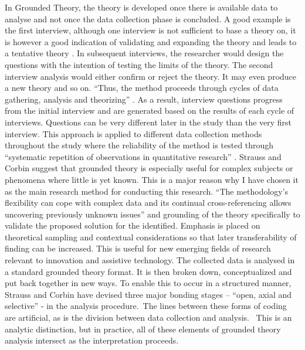 In Grounded Theory, the theory is developed once there is available data to analyse and not once the data collection phase is concluded. A good example is the first interview, although one interview is not sufficient to base a theory on, it is however a good indication of validating and expanding the theory and leads to a tentative theory \parencite{Cox2008}.
In subsequent interviews, the researcher would design the questions with the intention of testing the limits of the theory. The second interview analysis would either confirm or reject the theory. It may even produce a new theory and so on. ``Thus, the method proceeds through cycles of data gathering, analysis and theorizing'' \parencite{Cox2008}. As a result, interview questions progress from the initial interview and are generated based on the results of each cycle of interviews. Questions can be very different later in the study than the very first interview. This approach is applied to different data collection methods throughout the study where the reliability of the method is tested through ``systematic repetition of observations in quantitative research'' \parencite{Strauss1990}.
Strauss and Corbin \parencite{Strauss2008} suggest that grounded theory is especially useful for complex subjects or phenomena where little is yet known. This is a major reason why I have chosen it as the main research method for conducting this research. ``The methodology's flexibility can cope with complex data and its continual cross-referencing allows uncovering previously unknown issues'' \parencite{Strauss2008} and grounding of the theory specifically to validate the proposed solution for the identified. Emphasis is placed on theoretical sampling and contextual considerations so that later transferability of finding can be increased. 
This is useful for new emerging fields of research relevant to innovation and assistive technology. 
The collected data is analysed in a standard grounded theory format. It is then broken down, conceptualized and put back together in new ways. To enable this to occur in a structured manner, Strauss and Corbin \parencite{Strauss2008} have devised three major bonding stages – ``open, axial and selective'' \parencite{Strauss2008} - in the analysis procedure. The lines between these forms of coding are artificial, as is the division between data collection and analysis.  This is an analytic distinction, but in practice, all of these elements of grounded theory analysis intersect as the interpretation proceeds.

